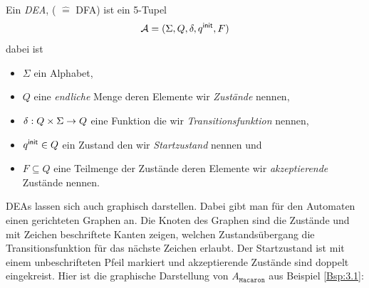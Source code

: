 \begin{Def}
        Ein \emph{\acf{DEA}}, ( $\hat=$ \acl{DFA}) ist ein 5-Tupel
        \[ \mathcal{A}= (\Sigma, Q,\delta,{q^\mathsf{init}},F) \]
dabei ist
        \begin{itemize}
                \item $\Sigma$ ein Alphabet,
                \item $Q$ eine \emph{endliche} Menge deren Elemente wir \emph{Zustände} nennen,
                \item $\delta:Q\x\Sigma\->Q$ eine Funktion die wir \emph{Transitionsfunktion} nennen,
                \item ${q^\mathsf{init}}\in Q$ ein Zustand den wir \emph{Startzustand} nennen und
                \item $F\subseteq Q$ eine Teilmenge der Zustände deren Elemente wir \emph{akzeptierende} Zustände nennen.
        \end{itemize}
\end{Def}

DEAs lassen sich auch graphisch darstellen.
Dabei gibt man für den Automaten einen gerichteten Graphen an.
Die Knoten des Graphen sind die Zustände und mit Zeichen beschriftete Kanten zeigen, welchen Zustandsübergang die Transitionsfunktion für das nächste Zeichen erlaubt.
Der Startzustand ist mit einem unbeschrifteten Pfeil markiert und akzeptierende Zustände sind doppelt eingekreist.
Hier ist die graphische Darstellung von $A_{\mathtt{Macaron}}$ aus Beispiel \ref{Bsp:3.1}:

